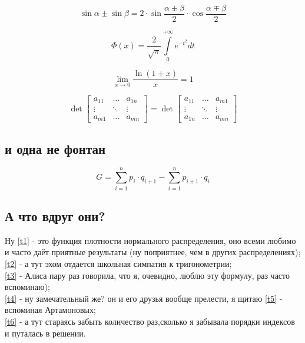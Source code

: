 \documentclass[12pt,a4paper,oneside]{article}
\begin{document}
\begin{equation}\label{t2}
\sin{\alpha}\pm \sin{\beta} = 2 \cdot \sin{\dfrac{\alpha \pm \beta}{2}} \cdot \cos{\dfrac{\alpha \mp \beta}{2}}\tag{\ae\ae}
\end{equation}

\begin{equation} \label{t3}
\Phi(x) = \dfrac {2}{\sqrt{\pi}} \int\limits_0^{+\infty} e^{-t^2}dt\tag{\ae\ae\ae}
\end{equation}

\begin{equation} \label{t4}
\lim\limits_{x \to 0}\dfrac{\ln{(1+x)}}{x}=1\tag{\ae\ae\ae\ae}
\end{equation}

\begin{equation} \label{t5}
\det\begin{bmatrix}a_{11} & \dots & a_{1n} \\
\vdots & \ddots & \vdots \\
a_{m1} & \dots & a_{mn}
\end{bmatrix} = \det\begin{bmatrix}a_{11} & \dots & a_{m1} \\
\vdots & \ddots & \vdots \\
a_{1n} & \dots & a_{mn}\end{bmatrix}\tag{\ae\ae\ae\ae\ae}
\end{equation}
\subsection{и одна не фонтан}
\begin{equation} \label{t6}
G= \sum\limits_{i=1}^n p_i \cdot q_{i+1} - \sum\limits_{i=1}^n p_{i+1}\cdot q_i\tag{\ae\ae\ae\ae\ae\ae}
\end{equation}
\subsection{А что вдруг они?}
Ну \ref{t1} - это функция плотности нормального распределения, оно всеми любимо и часто даёт приятные результаты (ну поприятнее, чем в других распределениях);\\
\ref{t2} - а тут эхом отдается школьная симпатия к тригонометрии;\\
\ref{t3} - Алиса пару раз говорила, что я, очевидно, люблю эту формулу, раз часто вспоминаю);\\
\ref{t4} - ну замечательный же? он и его друзья вообще прелести, я щитаю
\ref{t5} - вспоминая Артамоновых;\\
\ref{t6} - а тут стараясь забыть количество раз,сколько я забывала порядки индексов и путалась в решении.
\end{document}
